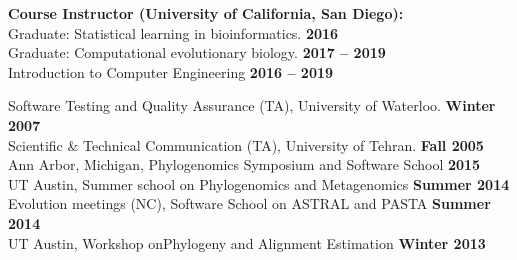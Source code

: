 \documentclass[margin,line,letterpaper]{resume}
\begin{document}
\begin{resume}
    \textbf{Course Instructor (University of California, San Diego):}\vspace{2mm}\\\vspace{1mm}%
     Graduate: Statistical learning in bioinformatics. \hfill \textbf{2016}\\
     Graduate:  Computational evolutionary biology. \hfill \textbf{2017 -- 2019}\\
     Introduction to Computer Engineering  \hfill \textbf{2016 -- 2019}


    Software Testing and Quality Assurance (TA), University of Waterloo.  \hfill \textbf{Winter 2007}\\
    Scientific \& Technical Communication (TA), University of Tehran.  \hfill \textbf{Fall 2005}\\
%
    Ann Arbor, Michigan, Phylogenomics Symposium and Software School \hfill \textbf{2015}\\
    UT Austin, Summer school on Phylogenomics and Metagenomics \hfill \textbf{Summer 2014}\\
    Evolution meetings (NC), Software School on ASTRAL and PASTA \hfill \textbf{Summer 2014}\\
    UT Austin, Workshop onPhylogeny and Alignment Estimation \hfill \textbf{Winter 2013}
%

    
    

\end{resume}
\end{document}
